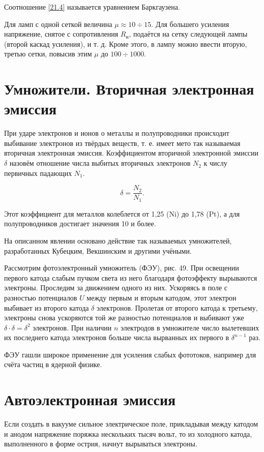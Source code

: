 \documentclass[a4paper,10pt]{book}
\begin{document}
Соотношение \ref{21.4} называется уравнением Баркгаузена.

Для ламп с одной сеткой величина $\mu \approx 10 \div 15$. Для большего усиления напряжение, снятое с сопротивления $R_\text{н}$, подаётся на сетку следующей лампы (второй каскад усиления), и т. д. Кроме этого, в лампу можно ввести вторую, третью сетки, повысив этим $\mu$ до $100 \div 1000$.

\section{Умножители. Вторичная электронная эмиссия}

При ударе электронов и ионов о металлы и полупроводники происходит выбивание электронов из твёрдых веществ, т. е. имеет мето так называемая вторичная электронная эмиссия. Коэффициентом вторичной электронной эмиссии $\delta$ назовём отношение числа выбитых вторичных электронов $N_2$ к числу первичных падающих $N_1$.

\begin{equation}
\delta = \frac{N_2}{N_1}.
\end{equation}

Этот коэффициент для металлов колеблется от 1,25 (Ni) до 1,78 (Pt), а для полупроводников достигает значения 10 и более.

На описанном явлении основано действие так называемых умножителей, разработанных Кубецким, Векшинским и другими учёными.

Рассмотрим фотоэлектронный умножитель (ФЭУ), рис. 49. При освещении первого катода слабым пучком света из него благодаря фотоэффекту вырываются электроны. Проследим за движением одного из них. Ускоряясь в поле с разностью потенциалов $U$ между первым и вторым катодом, этот электрон выбивает из второго катода $\delta$ электронов. Пролетая от второго катода к третьему, электроны снова ускоряются той же разностью потенциалов и выбивают уже $\delta\cdot\delta=\delta^{2}$ электронов. При наличии $n$ электродов в умножителе число вылетевших их последнего катода электронов больше числа вырванных их первого в $\delta^{n-1}$ раз.

ФЭУ гашли широкое применение для усиления слабых фототоков, например для счёта частиц в ядерной физике.

\section{Автоэлектронная эмиссия}

Если создать в вакууме сильное электрическое поле, прикладывая между катодом и анодом напряжение поряжка нескольких тысяч вольт, то из холодного катода, выполненного в форме острия, начнут вырываться электроны.
\end{document}
